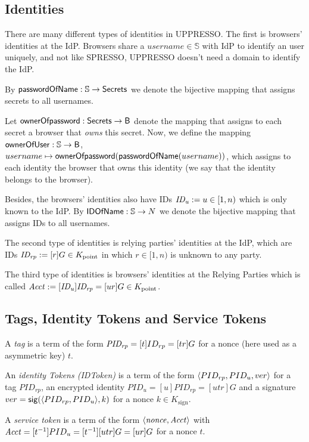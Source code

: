   \subsection{Identities}\label{app:uppresso-identities}
  There are many different types of identities in UPPRESSO. 
  The first is browsers' identities at the IdP. Browsers share
  a $username\in\mathbb{S}$ with IdP to identify an user 
  uniquely, and not like SPRESSO, UPPRESSO doesn't need a 
  domain to identify the IdP.
  
  By $\mathsf{passwordOfName}:\mathbb{S} \to \mathsf{Secrets}$ we denote the bijective 
  mapping that assigns secrets to all usernames. 
  
  Let $\mathsf{ownerOfpassword}: \mathsf{Secrets} \to \mathsf{B}$ denote the 
  mapping that assigns to each secret a browser that 
  \emph{owns} this secret. Now, we define the mapping 
  $\mathsf{ownerOfUser}: \mathbb{S} \to \mathsf{B}$, $username \mapsto
  \mathsf{ownerOfpassword}(\mathsf{passwordOfName}(username))$, which assigns to each 
  identity the browser that owns this identity (we say that the 
  identity belongs to the browser).
  
  Besides, the browsers' identities also have IDs 
  $\mathit{ID_u}:=u\in[1,n)$ which is only known to the IdP. By $\mathsf{IDOfName}:\mathbb{S} \to N$ we denote 
  the bijective mapping that assigns IDs to all usernames. 
  
  The second type of identities is relying parties' identities 
  at the IdP, which are IDs 
  $\mathit{ID_{rp}}:=[r]G \in K_{\text{point}}$ in which $r\in[1,n)$ 
  is unknown to any party.
  
  The third type of identities is browsers' identities at the
  Relying Parties which is called $\mathit{Acct} := [\mathit{ID_u}]
  \mathit{ID_{rp}} = [ur]G \in K_{\text{point}}$. 
  
  \subsection{Tags, Identity Tokens and Service Tokens}\label{app:identity-assertions}
  
  \begin{definition}\label{def:tag}
    A \emph{tag} is a term of the form $\mathit{PID_{rp}}=[t]ID_{rp}=[tr]G$ for a nonce 
    (here used as a asymmetric key) $t$.
  \end{definition}
  \begin{definition}
    An \emph{identity Tokens (IDToken)} is a term of the form 
    $\langle PID_{rp}, PID_u, ver\rangle$ for a tag $PID_{rp}$, an encrypted identity 
    $PID_u=[u]PID_{rp}=[utr]G$ and a signature $ver=\mathsf{sig}({\langle PID_{rp},PID_u\rangle},{k})$ 
    for a nonce $k\in K_{\text{sign}}$.
  \end{definition}
  \begin{definition}
    A \emph{service token} is a term of the form 
    $\langle {{}\mathit{nonce}, \mathit{Acct}} \rangle$ with 
    $\mathit{Acct} = [t^{-1}]PID_u=[t^{-1}][utr]G=[ur]G$ 
    for a nonce $t$.
  \end{definition}
  
